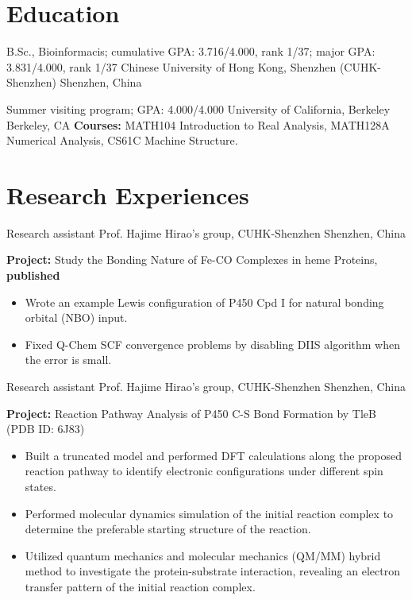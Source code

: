 \documentclass[11pt]{moderncv}
\begin{document}
\maketitle



\vspace{-3em}
\section{Education}
{B.Sc., Bioinformacis; cumulative GPA: 3.716/4.000, rank 1/37; major GPA: 3.831/4.000, rank 1/37}
{Chinese University of Hong Kong, Shenzhen (CUHK-Shenzhen)}
{Shenzhen, China}
{}
{}

{Summer visiting program; GPA: 4.000/4.000}
{University of California, Berkeley}
{Berkeley, CA}
{}
{\textbf{Courses:} MATH104 Introduction to Real Analysis, MATH128A Numerical Analysis, CS61C Machine Structure.}


\vspace{-0.75em}
\section{Research Experiences}
{Research assistant}
{Prof. Hajime Hirao's group, CUHK-Shenzhen}
{Shenzhen, China}
{}
{\textbf{Project:} Study the Bonding Nature of Fe-CO Complexes in heme Proteins, \textbf{published}
    \begin{itemize}\setlength\itemsep{-1pt}
        \item Wrote an example Lewis configuration of P450 Cpd I for natural bonding orbital (NBO) input.
        \item Fixed Q-Chem SCF convergence problems by disabling DIIS algorithm when the error is small.
    \end{itemize}
}

{Research assistant}
{Prof. Hajime Hirao's group, CUHK-Shenzhen}
{Shenzhen, China}
{}
{\textbf {Project:} Reaction Pathway Analysis of P450 C-S Bond Formation by TleB (PDB ID: 6J83)
    \begin{itemize}\setlength\itemsep{-1pt}
    \item Built a truncated model and performed DFT calculations along the proposed reaction pathway to identify electronic configurations under different spin states.
    \item Performed molecular dynamics simulation of the initial reaction complex to determine the preferable starting structure of the reaction.
    \item Utilized quantum mechanics and molecular mechanics (QM/MM) hybrid method to investigate the protein-substrate interaction, revealing an electron transfer pattern of the initial reaction complex.
\end{itemize}
}
\end{document}
